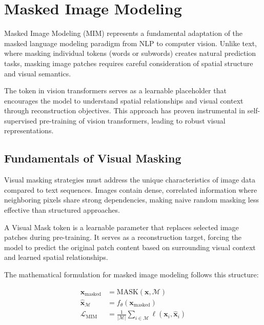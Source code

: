 
\section{Masked Image Modeling}

Masked Image Modeling (MIM) represents a fundamental adaptation of the masked language modeling paradigm from NLP to computer vision. Unlike text, where masking individual tokens (words or subwords) creates natural prediction tasks, masking image patches requires careful consideration of spatial structure and visual semantics.

The \mask{} token in vision transformers serves as a learnable placeholder that encourages the model to understand spatial relationships and visual context through reconstruction objectives. This approach has proven instrumental in self-supervised pre-training of vision transformers, leading to robust visual representations.

\subsection{Fundamentals of Visual Masking}

Visual masking strategies must address the unique characteristics of image data compared to text sequences. Images contain dense, correlated information where neighboring pixels share strong dependencies, making naive random masking less effective than structured approaches.

\begin{definition}
A Visual Mask token is a learnable parameter that replaces selected image patches during pre-training. It serves as a reconstruction target, forcing the model to predict the original patch content based on surrounding visual context and learned spatial relationships.
\end{definition}

The mathematical formulation for masked image modeling follows this structure:

\begin{align}
\mathbf{x}_{\text{masked}} &= \text{MASK}(\mathbf{x}, \mathcal{M}) \\
\hat{\mathbf{x}}_{\mathcal{M}} &= f_{\theta}(\mathbf{x}_{\text{masked}}) \\
\mathcal{L}_{\text{MIM}} &= \frac{1}{|\mathcal{M}|} \sum_{i \in \mathcal{M}} \ell(\mathbf{x}_i, \hat{\mathbf{x}}_i)
\end{align}

